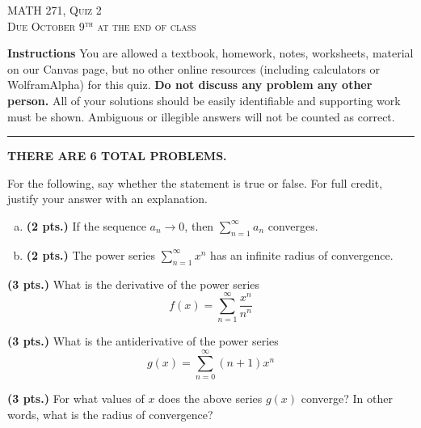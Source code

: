 \documentclass[12pt]{amsbook}
\begin{document}

\begin{center}
   \textsc{\large MATH 271, Quiz 2}\\
   \textsc{Due October 9$^\textrm{th}$ at the end of class}
\end{center}

\vspace{1cm}

\noindent\textbf{Instructions} \; You are allowed a textbook, homework, notes, worksheets, material on our Canvas page, but no other online resources (including calculators or WolframAlpha) for this quiz.  \textbf{Do not discuss any problem any other person.} All of your solutions should be easily identifiable and supporting work must be shown.  Ambiguous or illegible answers will not be counted as correct.


\vspace*{.5cm}
\hrule
\vspace*{.5cm}

\begin{center}\textbf{\large THERE ARE 6 TOTAL PROBLEMS.}\normalsize \end{center}

\begin{problem} For the following, say whether the statement is true or false. For full credit, justify your answer with an explanation.
\begin{enumerate}[(a)]
    \item \textbf{(2 pts.)} If the sequence $a_n \to 0$, then $\displaystyle{\sum_{n=1}^\infty a_n}$ converges.
    \item \textbf{(2 pts.)} The power series $\displaystyle{\sum_{n=1}^\infty x^n}$ has an infinite radius of convergence.
\end{enumerate}
\end{problem}

\begin{problem}
\textbf{(3 pts.)} What is the derivative of the power series
\[
f(x) = \sum_{n=1}^\infty \frac{x^n}{n^n}
\]
\end{problem}



\begin{problem}
\textbf{(3 pts.)} What is the antiderivative of the power series
\[
g(x) = \sum_{n=0}^\infty (n+1)x^n
\]
\end{problem}


\begin{problem}
\textbf{(3 pts.)} For what values of $x$ does the above series $g(x)$ converge? In other words, what is the radius of convergence?
\end{problem}
\vspace*{.5cm}
\end{document}
